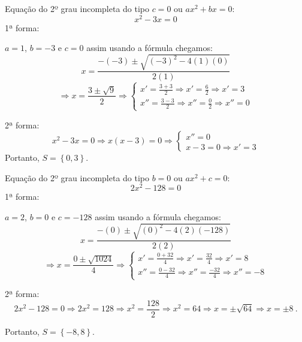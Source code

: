  \begin{exem}
   Equação do 2º grau incompleta do tipo $c=0$ ou $ax^2 + bx = 0$:
\begin{equation}
x^2 - 3x = 0
\end{equation}
  1ª forma:

  $a = 1$, $b = -3$ e $c = 0$ assim usando a fórmula chegamos:
\begin{equation}
x = \frac{- (-3) \pm \sqrt{(-3)^2 - 4 (1)(0)}}{2 (1)}
\end{equation}
  \[\Rightarrow x = \frac{3 \pm \sqrt{9}}{2} \Rightarrow \begin{cases}
                                                          x' = \frac{3 + 3}{2} \Rightarrow x' = \frac{6}{2} \Rightarrow x' = 3 \\
                                                          x'' = \frac{3 - 3}{2} \Rightarrow x''= \frac{0}{2} \Rightarrow x''= 0
                                                         \end{cases}\]

  2ª forma:
  \[x^2 - 3x = 0 \Rightarrow x(x - 3)=0 \Rightarrow \begin{cases}
                                                     x''= 0 \\
                                                     x - 3 = 0 \Rightarrow x' = 3
                                                    \end{cases}\]
 Portanto, $S= \left\{ 0, 3 \right\}$. 
 \end{exem}
 
 \begin{exem}
  Equação do 2º grau incompleta do tipo $b=0$ ou $ax^2 + c = 0$:
\begin{equation}
2x^2 - 128 = 0
\end{equation}
  1ª forma:

  $a = 2$, $b = 0$ e $c = -128$ assim usando a fórmula chegamos:
\begin{equation}
x = \frac{- (0) \pm \sqrt{(0)^2 - 4 (2)(-128)}}{2 (2)}
\end{equation}
  \[\Rightarrow x = \frac{0 \pm \sqrt{1024}}{4} \Rightarrow \begin{cases}
                                                          x' = \frac{ 0 + 32}{4} \Rightarrow x' = \frac{32}{4} \Rightarrow x' = 8 \\
                                                          x'' = \frac{0 - 32}{4} \Rightarrow x''= \frac{-32}{4} \Rightarrow x''= -8
                                                         \end{cases}\]


  2ª forma:
\begin{equation}
2x^2 - 128 = 0 \Rightarrow 2x^2 = 128 \Rightarrow x^2 = \frac{128}{2} \Rightarrow x^2 = 64 \Rightarrow x = \pm \sqrt{64} \Rightarrow x = \pm 8 \ .
\end{equation}
  
  Portanto, $S= \left\{ -8, 8 \right\}$.
\end{exem}

